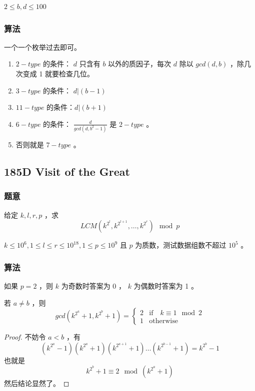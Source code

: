 \documentclass[11pt]{article}
\begin{document}
    $2 \leq b, d \leq 100$
\subsubsection{算法}
\label{sec-10-7-2}

    一个一个枚举过去即可。
\begin{enumerate}
\item $2-type$ 的条件： $d$ 只含有 $b$ 以外的质因子，每次 $d$ 除以 $gcd (d, b)$ ，除几次变成 1 就要检查几位。
\item $3-type$ 的条件： $d \vert (b - 1)$
\item $11-type$ 的条件：$d \vert (b + 1)$
\item $6-type$ 的条件： $\frac{d}{gcd (d, b^2 - 1)}$ 是 $2-type$ 。
\item 否则就是 $7-type$ 。
\end{enumerate}
\subsection{185D  Visit of the Great}
\label{sec-10-8}
\subsubsection{题意}
\label{sec-10-8-1}

    给定 $k, l, r, p$ ，求
    $$LCM (k^{2^l}, k^{2^{l + 1}}, \dots, k^{2^{r}}) \mod{p}$$

    $k \leq 10^6, 1 \leq l \leq r \leq 10^18, 1 \leq p \leq 10^9$ 且 $p$ 为质数，测试数据组数不超过 $10^5$ 。
\subsubsection{算法}
\label{sec-10-8-2}

    如果 $p = 2$ ，则 $k$ 为奇数时答案为 0 ， $k$ 为偶数时答案为 1 。

\begin{theorem}
  若 $a \neq b$ ，则 
  $$gcd (k^{2^a} + 1, k^{2^b} + 1) = \begin{cases} 2 & \text{if} \quad k \equiv 1 \mod{2} \\ 1 & \text{otherwise}\end{cases}$$
\end{theorem}
\begin{proof}
  不妨令 $a < b$ ，有
  $$
  (k^{2^a} - 1)(k^{2^a} + 1)(k^{2^{a + 1}} + 1) \dots (k^{2^{b - 1}} + 1) = k^{2^b} - 1
  $$
  也就是 $$k^{2^b} + 1 \equiv 2 \mod{(k^{2^a} + 1)}$$
  然后结论显然了。
\end{proof}
\end{document}
